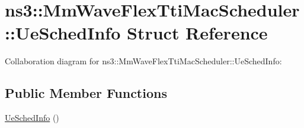 \hypertarget{structns3_1_1MmWaveFlexTtiMacScheduler_1_1UeSchedInfo}{}\section{ns3\+:\+:Mm\+Wave\+Flex\+Tti\+Mac\+Scheduler\+:\+:Ue\+Sched\+Info Struct Reference}
\label{structns3_1_1MmWaveFlexTtiMacScheduler_1_1UeSchedInfo}


Collaboration diagram for ns3\+:\+:Mm\+Wave\+Flex\+Tti\+Mac\+Scheduler\+:\+:Ue\+Sched\+Info\+:
\subsection*{Public Member Functions}
\begin{DoxyCompactItemize}
\item 
\hyperlink{structns3_1_1MmWaveFlexTtiMacScheduler_1_1UeSchedInfo_acd0a615d0cd1aea9a3f9f0d428a9c117}{Ue\+Sched\+Info} ()
\end{DoxyCompactItemize}
